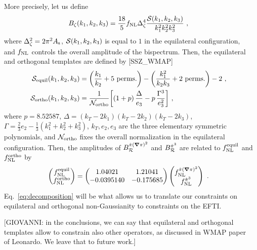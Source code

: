 \documentclass[aps,prd,amsmath,floats,floatfix,superscriptaddress,nofootinbib%
]{revtex4}%
\renewcommand\({\left(}
\renewcommand\){\right)}
\renewcommand\[{\left[}
\renewcommand\]{\right]}
\renewcommand{\vec}{\bm}
\begin{document}
More precisely, let us define 
\begin{equation} 
\label{eq:B_primordial_master_definition}
B_\zeta(k_1,k_2,k_3) = \frac{18}{5}f_{\rm NL}\Delta^4_\zeta\frac{{\cal S}(k_1,k_2,k_3)}{k_1^2k_2^2k_3^2}\,\,, 
\end{equation}
where $\Delta^2_\zeta = 2\pi^2 A_{\rm s}$, ${\cal S}(k_1,k_2,k_3)$ is equal to $1$ in the equilateral configuration, and $f_{\rm NL}$ controls the overall amplitude of the bispectrum. Then, the equilateral and orthogonal templates are defined by [SSZ\_WMAP] 
\begin{align}
{\cal S}_{\rm equil}(k_1,k_2,k_3) &= \bigg(\frac{k_1}{k_2} + \text{$5$ perms.}\bigg) - \bigg(\frac{k_1^2}{k_2k_3} + \text{$2$ perms.}\bigg) - 2\,\,, \label{eq:equilateral_template} \\
{\cal S}_{\rm ortho}(k_1,k_2,k_3) &= \frac{1}{{\cal N}_{\rm ortho}}\bigg[(1+p)\,\frac{\Delta}{e_3} - p\,\frac{\Gamma^3}{e_3^2}\bigg]\,\,, \label{eq:orthogonal_template}
\end{align} 
where $p = %
8.52587$, $\Delta = (k_T-2k_1)(k_T-2k_2)(k_T-2k_3)$, 
$\Gamma = \frac{2}{3}e_2 - \frac{1}{3}(k_1^2+k_2^2+k_3^2)$, $k_T, e_2, e_3$ are the three elementary symmetric polynomials, 
and ${\cal N}_{\rm ortho}$ fixes the overall normalization in the equilateral configuration. 
Then, the amplitudes %
of $B_{\cal R}^{\dot{\pi}(\vec{\nabla}\pi)^2}$ and $B_{\cal R}^{\dot{\pi}^3}$ are related to $f_{\rm NL}^{\rm equil}$ and $f_{\rm NL}^{\rm ortho}$ by 
\begin{equation}
\label{eq:decomposition} 
\begin{pmatrix}
f_{\rm NL}^{\rm equil} \\
f_{\rm NL}^{\rm ortho}
\end{pmatrix}
 = \begin{pmatrix}
1.04021 & 1.21041 \\
-0.0395140 & -0.175685
\end{pmatrix}
\begin{pmatrix}
f_{\rm NL}^{\dot{\pi}(\vec{\nabla}\pi)^2} \\
f_{\rm NL}^{\dot{\pi}^3}
\end{pmatrix}\,\,. %
\end{equation} 
Eq.~\eqref{eq:decomposition} will be what allows us to translate our constraints on equilateral and orthogonal non-Gaussianity to constraints on the EFTI. 

[GIOVANNI: in the conclusions, we can say that equilateral and orthogonal templates allow to constrain also other operators, as discussed in WMAP paper of Leonardo. We leave that to future work.] 
\end{document}

